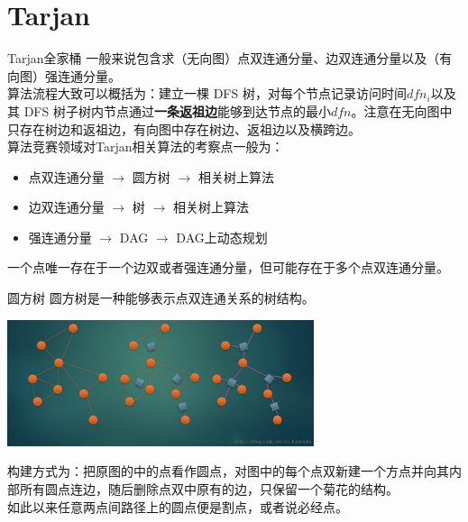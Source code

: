 \documentclass{beamer}
\begin{document}
\section{Tarjan}
\begin{frame}{Tarjan全家桶}
	一般来说包含求（无向图）点双连通分量、边双连通分量以及（有向图）强连通分量。\\
	
	算法流程大致可以概括为：建立一棵 DFS 树，对每个节点记录访问时间$dfn_i$以及其 DFS 树子树内节点通过\textbf{一条返祖边}能够到达节点的最小$dfn$。注意在无向图中只存在树边和返祖边，有向图中存在树边、返祖边以及横跨边。\\
	
	算法竞赛领域对Tarjan相关算法的考察点一般为：
	
	\begin{itemize}
		\item 点双连通分量 $\to$ 圆方树 $\to$ 相关树上算法
		\item 边双连通分量 $\to$ 树 $\to$ 相关树上算法
		\item 强连通分量 $\to$ DAG $\to$ DAG上动态规划
	\end{itemize}
	
	一个点唯一存在于一个边双或者强连通分量，但可能存在于多个点双连通分量。
	
\end{frame}

\begin{frame}{圆方树}
	圆方树是一种能够表示点双连通关系的树结构。
	
	\begin{center}
		\includegraphics[width=9.0cm]{yuanfangshu.jpg}
	\end{center}

	构建方式为：把原图的中的点看作圆点，对图中的每个点双新建一个方点并向其内部所有圆点连边，随后删除点双中原有的边，只保留一个菊花的结构。\\
	
	如此以来任意两点间路径上的圆点便是割点，或者说必经点。
\end{frame}
\end{document}
